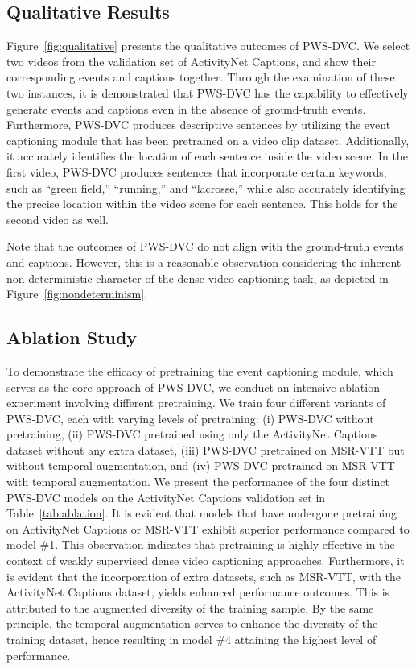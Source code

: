\subsection{Qualitative Results}
Figure~\ref{fig:qualitative} presents the qualitative outcomes of PWS-DVC.
We select two videos from the validation set of ActivityNet Captions, and show their corresponding events and captions together.
Through the examination of these two instances, it is demonstrated that PWS-DVC has the capability to effectively generate events and captions even in the absence of ground-truth events.
Furthermore, PWS-DVC produces descriptive sentences by utilizing the event captioning module that has been pretrained on a video clip dataset.
Additionally, it accurately identifies the location of each sentence inside the video scene.
In the first video, PWS-DVC produces sentences that incorporate certain keywords, such as ``green field,'' ``running,'' and ``lacrosse,'' while also accurately identifying the precise location within the video scene for each sentence.
This holds for the second video as well.

Note that the outcomes of PWS-DVC do not align with the ground-truth events and captions.
However, this is a reasonable observation considering the inherent non-deterministic character of the dense video captioning task, as depicted in Figure~\ref{fig:nondeterminism}.

\subsection{Ablation Study}
To demonstrate the efficacy of pretraining the event captioning module, which serves as the core approach of PWS-DVC, we conduct an intensive ablation experiment involving different pretraining.
We train four different variants of PWS-DVC, each with varying levels of pretraining: (i) PWS-DVC without pretraining, (ii) PWS-DVC pretrained using only the ActivityNet Captions dataset without any extra dataset, (iii) PWS-DVC pretrained on MSR-VTT but without temporal augmentation, and (iv) PWS-DVC pretrained on MSR-VTT with temporal augmentation.
We present the performance of the four distinct PWS-DVC models on the ActivityNet Captions validation set in Table~\ref{tab:ablation}.
It is evident that models that have undergone pretraining on ActivityNet Captions or MSR-VTT exhibit superior performance compared to model \#1.
This observation indicates that pretraining is highly effective in the context of weakly supervised dense video captioning approaches.
Furthermore, it is evident that the incorporation of extra datasets, such as MSR-VTT, with the ActivityNet Captions dataset, yields enhanced performance outcomes.
This is attributed to the augmented diversity of the training sample.
By the same principle, the temporal augmentation serves to enhance the diversity of the training dataset, hence resulting in model \#4 attaining the highest level of performance.